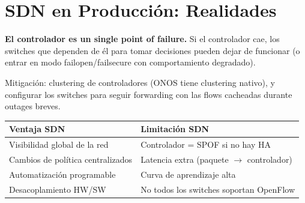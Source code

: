 \section{ SDN en Producción: Realidades}

\begin{cuidado}
\textbf{El controlador es un single point of failure.} Si el controlador cae, los
switches que dependen de él para tomar decisiones pueden dejar de funcionar (o entrar
en modo failopen/failsecure con comportamiento degradado).

Mitigación: clustering de controladores (ONOS tiene clustering nativo), y configurar
los switches para seguir forwarding con las flows cacheadas durante outages breves.
\end{cuidado}

\begin{center}
\begin{tabular}{ll}
\toprule
\textbf{Ventaja SDN} & \textbf{Limitación SDN} \\
\midrule
Visibilidad global de la red    & Controlador = SPOF si no hay HA \\
Cambios de política centralizados & Latencia extra (paquete $\to$ controlador) \\
Automatización programable      & Curva de aprendizaje alta \\
Desacoplamiento HW/SW           & No todos los switches soportan OpenFlow \\
\bottomrule
\end{tabular}
\end{center}
